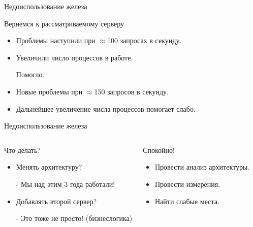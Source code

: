 \documentclass[aspectratio=169]{beamer}
\begin{document}
\begin{frame}{Недоиспользование железа}
    \begin{block}{Вернемся к рассматриваемому серверу}
        \begin{itemize}
            \pause\item Проблемы наступили при $\approx$100 запросах в секунду.
            
            \pause\item Увеличили число процессов в работе.
                \pause\par Помогло.

            \pause\item Новые проблемы при $\approx$150 запросов в секунду.
            
            \pause\item Дальнейшее увеличение числа процессов помогает слабо.
        \end{itemize}
    \end{block}
\end{frame}

\begin{frame}{Недоиспользование железа}

    \begin{columns}
        \begin{block}{Что делать?}
            \begin{itemize}
                \pause\item Менять архитектуру?
                    \pause\par - Мы над этим 3 года работали!

                \pause\item Добавлять второй сервер?
                    \pause\par - Это тоже не просто! (бизнеслогика)
            \end{itemize}
        \end{block}

        \begin{block}{Спокойно!}
            \begin{itemize}
                \pause\item Провести анализ архитектуры.
                \pause\item Провести измерения.
                \pause\item Найти слабые места.
            \end{itemize}
        \end{block}
    \end{columns}
\end{frame}
\end{document}
